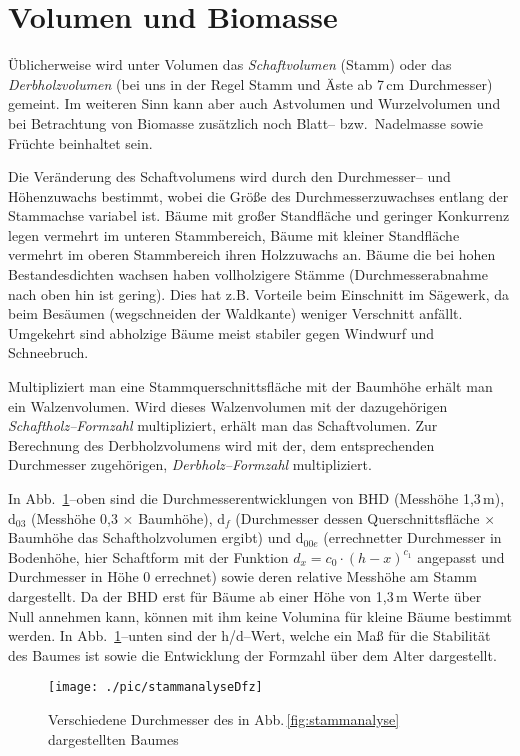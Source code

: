\documentclass[twocolumn]{scrartcl}
\begin{document}
\section{Volumen und Biomasse}

Üblicherweise wird unter Volumen das \emph{Schaftvolumen} (Stamm) oder das
\emph{Derbholzvolumen} (bei uns in der Regel Stamm und Äste ab 7\,cm
Durchmesser) gemeint. Im weiteren Sinn kann aber auch Astvolumen und
Wurzelvolumen und bei Betrachtung von Biomasse zusätzlich noch Blatt-- bzw.\
Nadelmasse sowie Früchte beinhaltet sein.

Die Veränderung des Schaftvolumens wird durch den Durchmesser-- und Höhenzuwachs
bestimmt, wobei die Größe des Durchmesserzuwachses entlang der Stammachse
variabel ist. Bäume mit großer Standfläche und geringer Konkurrenz legen
vermehrt im unteren Stammbereich, Bäume mit kleiner Standfläche vermehrt im
oberen Stammbereich ihren Holzzuwachs an. Bäume die bei hohen Bestandesdichten
wachsen haben vollholzigere Stämme (Durchmesserabnahme nach oben hin ist
gering). Dies hat z.B. Vorteile beim Einschnitt im Sägewerk, da beim Besäumen
(wegschneiden der Waldkante) weniger Verschnitt anfällt. Umgekehrt sind
abholzige Bäume meist stabiler gegen Windwurf und Schneebruch.

Multipliziert man eine Stammquerschnittsfläche mit der Baumhöhe erhält man ein
Walzenvolumen. Wird dieses Walzenvolumen mit der dazugehörigen
\emph{Schaftholz--Formzahl} multipliziert, erhält
man das Schaftvolumen. Zur Berechnung des Derbholzvolumens wird mit der, dem
entsprechenden Durchmesser zugehörigen,
\emph{Derbholz--Formzahl} multipliziert.

In Abb.~\ref{fig:stammanalyseDfz}--oben sind die Durchmesserentwicklungen von
BHD (Messhöhe 1,3\,m), d$_{03}$ (Messhöhe 0,3 $\times$ Baumhöhe), d$_f$
(Durchmesser dessen Querschnittsfläche $\times$ Baumhöhe das Schaftholzvolumen
ergibt) und d$_{00e}$ (errechnetter Durchmesser in Bodenhöhe, hier Schaftform
mit der Funktion $d_x = c_0 \cdot (h - x)^{c_1}$ angepasst und Durchmesser in
Höhe 0 errechnet) sowie deren relative Messhöhe am Stamm dargestellt. Da der BHD
erst für Bäume ab einer Höhe von 1,3\,m Werte über Null annehmen kann, können
mit ihm keine Volumina für kleine Bäume bestimmt werden. In
Abb.~\ref{fig:stammanalyseDfz}--unten sind der h/d--Wert, welche ein Maß für die
Stabilität des Baumes ist sowie die Entwicklung der Formzahl über dem Alter
dargestellt.

\begin{figure}[htbp]
  \centering
  \texttt{[image: ./pic/stammanalyseDfz]}
  \caption{Verschiedene Durchmesser des in Abb.\,\ref{fig:stammanalyse}
  dargestellten Baumes}
  \label{fig:stammanalyseDfz}
\end{figure}
\end{document}
